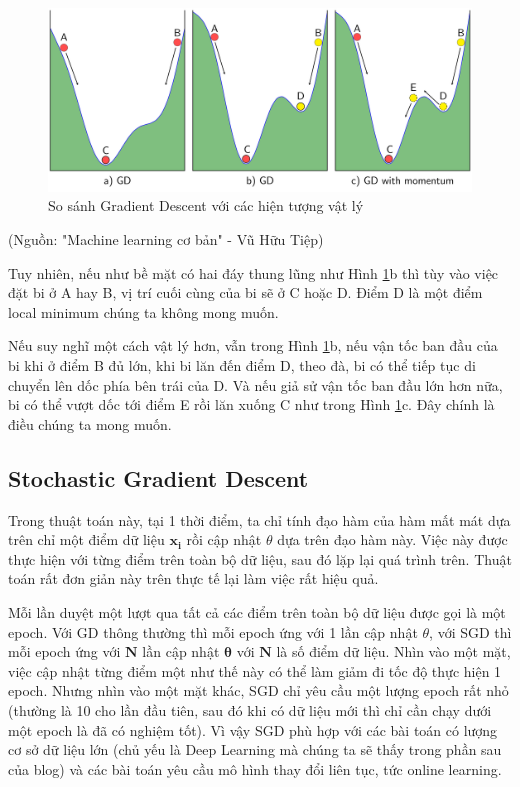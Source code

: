 \FloatBarrier
\begin{figure}[htp]
\begin{center}
\includegraphics[scale=0.06]{chap4/c4_figs/momentum.png}
\end{center}
\caption{So sánh Gradient Descent với các hiện tượng vật lý}
\label{fig:gradient}
\end{figure}
\FloatBarrier

\centerline{(Nguồn: "Machine learning cơ bản" - Vũ Hữu Tiệp)}
Tuy nhiên, nếu như bề mặt có hai đáy thung lũng như Hình \ref{fig:gradient}b thì tùy vào việc đặt bi ở A hay B, vị trí cuối cùng của bi sẽ ở C hoặc D. Điểm D là một điểm local minimum chúng ta không mong muốn.

Nếu suy nghĩ một cách vật lý hơn, vẫn trong Hình \ref{fig:gradient}b, nếu vận tốc ban đầu của bi khi ở điểm B đủ lớn, khi bi lăn đến điểm D, theo đà, bi có thể tiếp tục di chuyển lên dốc phía bên trái của D. Và nếu giả sử vận tốc ban đầu lớn hơn nữa, bi có thể vượt dốc tới điểm E rồi lăn xuống C như trong Hình \ref{fig:gradient}c. Đây chính là điều chúng ta mong muốn.

\subsection{Stochastic Gradient Descent}
Trong thuật toán này, tại 1 thời điểm, ta chỉ tính đạo hàm của hàm mất mát dựa trên chỉ một điểm dữ liệu $\mathbf{x_i}$ rồi cập nhật 
$\theta$ dựa trên đạo hàm này. Việc này được thực hiện với từng điểm trên toàn bộ dữ liệu, sau đó lặp lại quá trình trên. Thuật toán rất đơn giản này trên thực tế lại làm việc rất hiệu quả.

Mỗi lần duyệt một lượt qua tất cả các điểm trên toàn bộ dữ liệu được gọi là một epoch. Với GD thông thường thì mỗi epoch ứng với 1 lần cập nhật $\theta$, với SGD thì mỗi epoch ứng với $\mathbf{N}$ lần cập nhật $\mathbf{\theta}$ với $\mathbf{N}$ là số điểm dữ liệu. Nhìn vào một mặt, việc cập nhật từng điểm một như thế này có thể làm giảm đi tốc độ thực hiện 1 epoch. Nhưng nhìn vào một mặt khác, SGD chỉ yêu cầu một lượng epoch rất nhỏ (thường là 10 cho lần đầu tiên, sau đó khi có dữ liệu mới thì chỉ cần chạy dưới một epoch là đã có nghiệm tốt). Vì vậy SGD phù hợp với các bài toán có lượng cơ sở dữ liệu lớn (chủ yếu là Deep Learning mà chúng ta sẽ thấy trong phần sau của blog) và các bài toán yêu cầu mô hình thay đổi liên tục, tức online learning.

